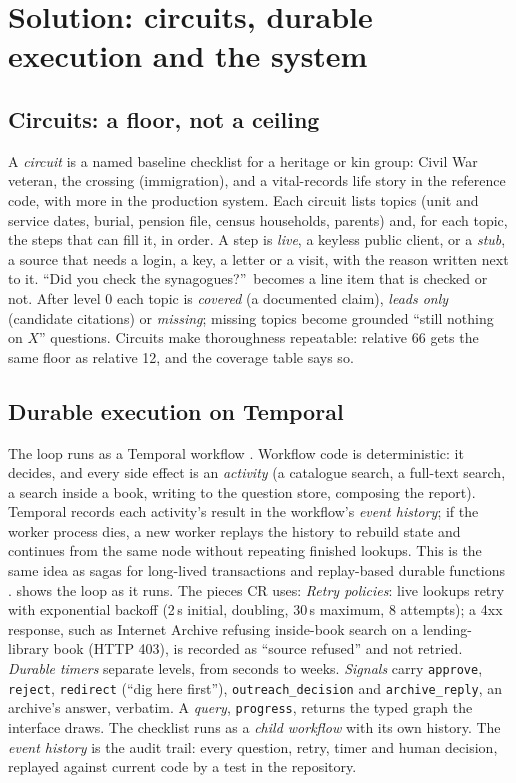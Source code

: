 \section{Solution: circuits, durable execution and the system}
\label{sec:solution}

\subsection{Circuits: a floor, not a ceiling}
A \emph{circuit} is a named baseline checklist for a heritage or kin group: Civil War veteran, the crossing (immigration), and a vital-records life story in the reference code, with more in the production system. Each circuit lists topics (unit and service dates, burial, pension file, census households, parents) and, for each topic, the steps that can fill it, in order. A step is \emph{live}, a keyless public client, or a \emph{stub}, a source that needs a login, a key, a letter or a visit, with the reason written next to it. ``Did you check the synagogues?''\ becomes a line item that is checked or not. After level 0 each topic is \emph{covered} (a documented claim), \emph{leads only} (candidate citations) or \emph{missing}; missing topics become grounded ``still nothing on $X$'' questions. Circuits make thoroughness repeatable: relative 66 gets the same floor as relative 12, and the coverage table says so.

\subsection{Durable execution on Temporal}
The loop runs as a Temporal workflow \citep{temporaldocs,temporalpythonsdk}. Workflow code is deterministic: it decides, and every side effect is an \emph{activity} (a catalogue search, a full-text search, a search inside a book, writing to the question store, composing the report). Temporal records each activity's result in the workflow's \emph{event history}; if the worker process dies, a new worker replays the history to rebuild state and continues from the same node without repeating finished lookups. This is the same idea as sagas for long-lived transactions \citep{garciamolina1987sagas} and replay-based durable functions \citep{burckhardt2021durable}.  shows the loop as it runs. The pieces CR uses:
\emph{Retry policies}: live lookups retry with exponential backoff (2\,s initial, doubling, 30\,s maximum, 8 attempts); a 4xx response, such as Internet Archive refusing inside-book search on a lending-library book (HTTP 403), is recorded as ``source refused'' and not retried. \emph{Durable timers} separate levels, from seconds to weeks. \emph{Signals} carry \texttt{approve}, \texttt{reject}, \texttt{redirect} (``dig here first''), \texttt{outreach\_decision} and \texttt{archive\_reply}, an archive's answer, verbatim. A \emph{query}, \texttt{progress}, returns the typed graph the interface draws. The checklist runs as a \emph{child workflow} with its own history. The \emph{event history} is the audit trail: every question, retry, timer and human decision, replayed against current code by a test in the repository.

